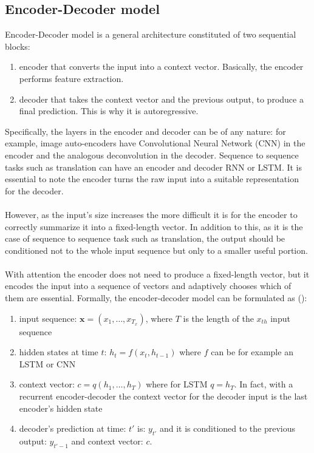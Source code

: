 \documentclass[LaM,binding=0.6cm]{sapthesis}
\begin{document}
\subsection{Encoder-Decoder model}
Encoder-Decoder model is a general architecture constituted of two sequential blocks:
\begin{enumerate}
\item encoder that converts the input into a context vector. Basically, the encoder performs feature extraction.
\item decoder that takes the context vector and the previous output, to produce a final prediction. This is why it is autoregressive.
\end{enumerate}
Specifically, the layers in the encoder and decoder can be of any nature: for example, image auto-encoders have Convolutional Neural Network (CNN) in the encoder and the analogous deconvolution in the decoder. Sequence to sequence tasks such as translation can have an encoder and decoder RNN or LSTM. It is essential to note the encoder turns the raw input into a suitable representation for the decoder.\\\\However, as the input's size increases the more difficult it is for the encoder to correctly summarize it into a fixed-length vector. In addition to this, as it is the case of sequence to sequence task such as translation, the output should be conditioned not to the whole input sequence but only to a smaller useful portion.\\\\With attention the encoder does not need to produce a fixed-length vector, but it encodes the input into a sequence of vectors and adaptively chooses which of them are essential. Formally, the encoder-decoder model can be formulated as (\cite{bah}):
\begin{enumerate}
\item input sequence: $\textbf{x}=(x_1,\dots,x_{T_{x}})$, where $T$ is the length of the $x_{th}$ input sequence
\item hidden states at time $t$: $h_t=f(x_t,h_{t-1})$ where $f$ can be for example an LSTM or CNN
\item context vector: $c=q(h_1,\dots,h_{T})$ where for LSTM $q=h_{T}$. In fact, with a recurrent encoder-decoder the context vector for the decoder input is the last encoder's hidden state
\item decoder's prediction at time: $t'$ is: $y_{t'}$ and it is conditioned to the previous output: $y_{t'-1}$ and context vector: $c$.
\end{enumerate}
\end{document}

